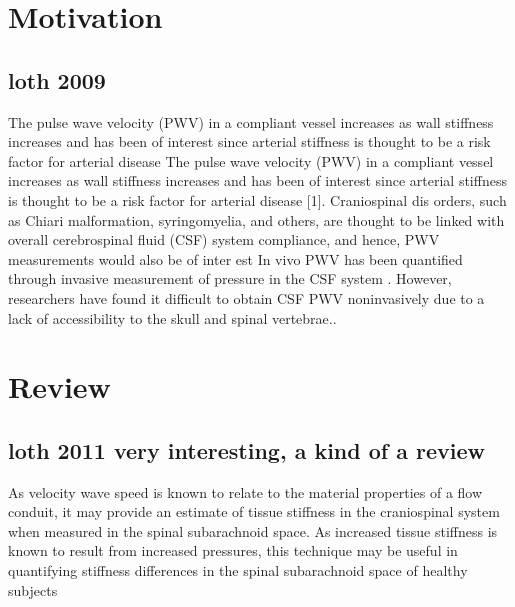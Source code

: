 \documentclass{report}
\begin{document}
\section{Motivation}
\subsection{loth 2009}
The pulse wave velocity (PWV) in a compliant vessel increases as
wall stiffness increases and has been of interest since arterial stiffness
is thought to be a risk factor for arterial disease
The pulse wave velocity (PWV) in a compliant vessel increases as
wall stiffness increases and has been of interest since arterial stiffness
is thought to be a risk factor for arterial disease [1]. Craniospinal dis
orders,
such as Chiari malformation, syringomyelia, and others, are
thought to be linked with overall cerebrospinal fluid (CSF) system compliance, and hence, PWV measurements would also be of inter
est \cite{william_1976} \cite{martin loth 2005}
In vivo PWV has been quantified through invasive measurement
of pressure in the CSF system \cite{williams_1976}. However, researchers have
found it difficult to obtain CSF PWV noninvasively due to a lack of
accessibility to the skull and spinal vertebrae..


\section{Review}

\subsection{loth 2011 very interesting, a kind of a review}

As velocity wave
speed is known to relate to the material properties of
a flow conduit, it may provide an estimate of tissue
stiffness in the craniospinal system when measured in
the spinal subarachnoid space. As increased tissue
stiffness is known to result from increased pressures,
this technique may be useful in quantifying stiffness
differences in the spinal subarachnoid space of
healthy subjects
\end{document}
